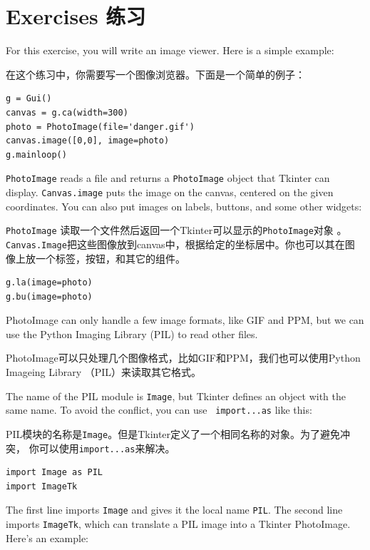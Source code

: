 \documentclass[10pt]{book}
\begin{document}
\begin{CJK}{UTF8}{gbsn}
\begin{description}
\end{description}


\section{Exercises 练习}

\begin{exercise}

For this exercise, you will write an image viewer.  Here is
a simple example:

在这个练习中，你需要写一个图像浏览器。下面是一个简单的例子：

\begin{verbatim}
g = Gui()
canvas = g.ca(width=300)
photo = PhotoImage(file='danger.gif')
canvas.image([0,0], image=photo)
g.mainloop()
\end{verbatim}
%
{\tt PhotoImage} reads a file and returns a {\tt PhotoImage} object
that Tkinter can display.  {\tt Canvas.image} puts the image on the
canvas, centered on the given coordinates.  You can also put images on
labels, buttons, and some other widgets:

{\tt PhotoImage} 读取一个文件然后返回一个Tkinter可以显示的{\tt PhotoImage}对象
。{\tt Canvas.Image}把这些图像放到canvas中，根据给定的坐标居中。你也可以其在图
像上放一个标签，按钮，和其它的组件。

\begin{verbatim}
g.la(image=photo)
g.bu(image=photo)
\end{verbatim}
%
PhotoImage can only handle a few image formats, like GIF and PPM, 
but we can use the Python Imaging Library (PIL) to read other
files.

PhotoImage可以只处理几个图像格式，比如GIF和PPM，我们也可以使用Python Imageing
Library （PIL）来读取其它格式。

The name of the PIL module is {\tt Image}, but Tkinter defines an
object with the same name.  To avoid the conflict, you can use {\tt
  import...as} like this:

PIL模块的名称是{\tt Image}。但是Tkinter定义了一个相同名称的对象。为了避免冲突，
你可以使用{\tt import...as}来解决。

\begin{verbatim}
import Image as PIL
import ImageTk
\end{verbatim}
%
The first line imports {\tt Image} and
gives it the local name {\tt PIL}.  The second
line imports {\tt ImageTk}, which can translate a PIL
image into a Tkinter PhotoImage.  Here's an example:


\end{exercise}
\end{CJK}
\end{document}
